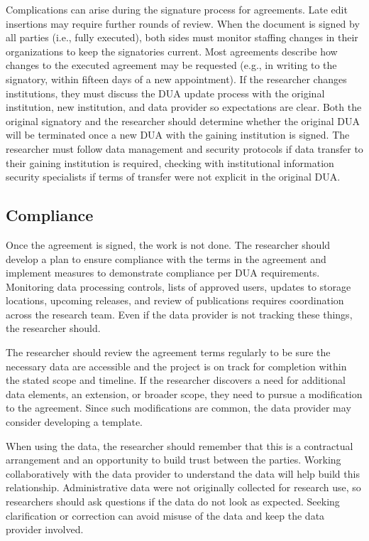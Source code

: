 \documentclass[
]{WileySix}
\begin{document}
Complications can arise during the signature process for agreements. Late edit insertions may require further rounds of review. When the document is signed by all parties (i.e., fully executed), both sides must monitor staffing changes in their organizations to keep the signatories current. Most agreements describe how changes to the executed agreement may be requested (e.g., in writing to the signatory, within fifteen days of a new appointment). If the researcher changes institutions, they must discuss the DUA update process with the original institution, new institution, and data provider so expectations are clear. Both the original signatory and the researcher should determine whether the original DUA will be terminated once a new DUA with the gaining institution is signed. The researcher must follow data management and security protocols if data transfer to their gaining institution is required, checking with institutional information security specialists if terms of transfer were not explicit in the original DUA.

\hypertarget{compliance}{%
\subsection{Compliance}\label{compliance}}

Once the agreement is signed, the work is not done. The researcher should develop a plan to ensure compliance with the terms in the agreement and implement measures to demonstrate compliance per DUA requirements. Monitoring data processing controls, lists of approved users, updates to storage locations, upcoming releases, and review of publications requires coordination across the research team. Even if the data provider is not tracking these things, the researcher should.

The researcher should review the agreement terms regularly to be sure the necessary data are accessible and the project is on track for completion within the stated scope and timeline. If the researcher discovers a need for additional data elements, an extension, or broader scope, they need to pursue a modification to the agreement. Since such modifications are common, the data provider may consider developing a template.

When using the data, the researcher should remember that this is a contractual arrangement and an opportunity to build trust between the parties. Working collaboratively with the data provider to understand the data will help build this relationship. Administrative data were not originally collected for research use, so researchers should ask questions if the data do not look as expected. Seeking clarification or correction can avoid misuse of the data and keep the data provider involved.
\end{document}
